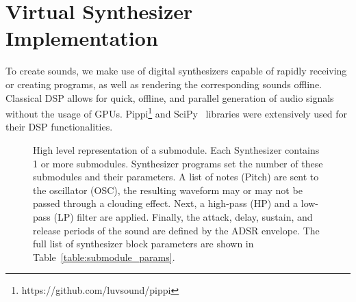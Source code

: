 \documentclass[\main/thesis.tex]{subfiles}
\begin{document}
\section{Virtual Synthesizer Implementation}
\label{virtual_synth_implementation}
 To create sounds, we make use of digital synthesizers capable of rapidly receiving or creating programs, as well as rendering the corresponding sounds offline. Classical DSP allows for quick, offline, and parallel generation of audio signals without the usage of GPUs. Pippi\footnote{https://github.com/luvsound/pippi} and SciPy~\cite{jones2001scipy} libraries were extensively used for their DSP functionalities. 

 \begin{figure}[htbp]
    \begin{center}
    \end{center}
    \caption{High level representation of a submodule. Each Synthesizer contains 1 or more submodules. Synthesizer programs set the number of these submodules and their parameters. A list of notes (Pitch) are sent to the oscillator (OSC), the resulting waveform may or may not be passed through a clouding effect. Next, a high-pass (HP) and a low-pass (LP) filter are applied. Finally, the attack, delay, sustain, and release periods of the sound are defined by the ADSR envelope. The full list of synthesizer block parameters are shown in Table~\ref{table:submodule_params}.
    }
\label{fig:submodule}
\end{figure}
\end{document}
